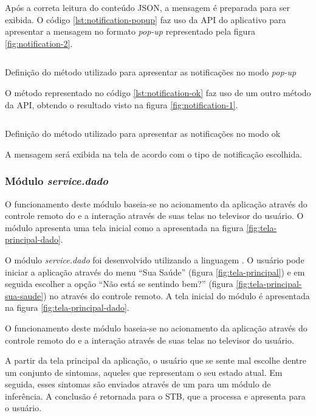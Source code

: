 Após a correta leitura do conteúdo JSON, a mensagem é preparada para ser 
exibida. O código \ref{lst:notification-popup} faz uso da API do aplicativo
\xbmc[] para apresentar a mensagem no formato \textit{pop-up} representado pela
figura \vref{fig:notification-2}.

\begin{listing}[ht!]
\inputminted{python}{codigos/notification-popup.py}
\caption{Definição do método utilizado para apresentar as notificações no modo
\textit{pop-up}}
\label{lst:notification-popup}
\end{listing}

O método representado no código \ref{lst:notification-ok} faz uso de um outro 
método da API, obtendo o resultado visto na figura \vref{fig:notification-1}.

\begin{listing}[ht!]
\inputminted{python}{codigos/notification-ok.py}
\caption{Definição do método utilizado para apresentar as notificações no modo
ok}
\label{lst:notification-ok}
\end{listing}

A mensagem será exibida na tela de acordo com o tipo de notificação escolhida. 

\subsubsection{Módulo \textit{service.dado}}\label{subsubsec:dado}

O funcionamento deste módulo baseia-se no acionamento da aplicação através
do controle remoto do \stb[] e a interação através de suas telas no televisor
do usuário. O módulo apresenta uma tela inicial como a apresentada na 
figura \vref{fig:tela-principal-dado}.

O módulo \textit{service.dado} foi desenvolvido utilizando a linguagem
\python[]. O usuário pode iniciar a aplicação através do menu ``Sua Saúde''
(figura \vref{fig:tela-principal}) e em seguida escolher a opção ``Não está se
sentindo bem?'' (figura \vref{fig:tela-principal-sua-saude}) no \stb[] através
do controle remoto. A tela inicial do módulo é  apresentada na figura
\vref{fig:tela-principal-dado}.

O funcionamento deste módulo baseia-se no acionamento da aplicação através
do controle remoto do \stb[] e a interação através de suas telas no televisor
do usuário. 

A partir da tela principal da aplicação, o usuário que se sente mal escolhe 
dentre um conjunto de sintomas, aqueles que representam o seu estado atual. Em
seguida, esses sintomas são enviados através de um \webservice[] para um
módulo de inferência. A conclusão é retornada para o STB, que a processa e 
apresenta para o usuário.

